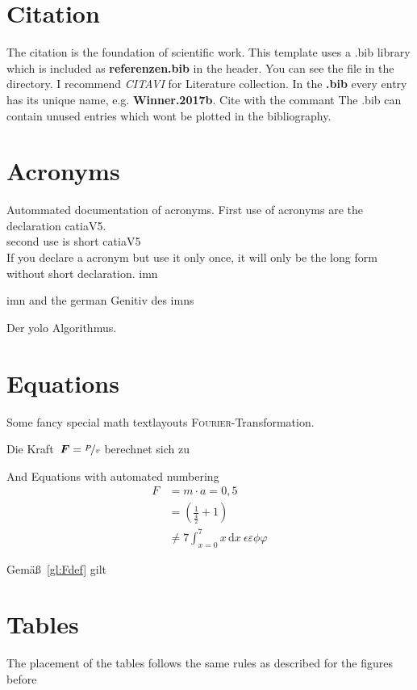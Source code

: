 \documentclass[12pt,
titlepage,
a4paper,
oneside,     %
openany,     %
listof=totoc,  %
numbers = noenddot, %
bibliography=totoc,    %
headsepline, %
]{scrbook} %
\newcommand{\ve}[1]{\ensuremath \boldsymbol{#1}\xspace}
\newcommand{\scFt}{\textsc{Fourier}-Transformation\xspace}
\begin{document}
\section{Citation}
\label{sec_citation}
The citation is the foundation of scientific work. This template uses a .bib library which is included as \textbf{referenzen.bib} in the header. You can see the file in the directory. I recommend \textit{CITAVI} for Literature collection.
In the \textbf{.bib} every entry has its unique name, e.g. \textbf{Winner.2017b}. Cite with the commant \cite{Winner.2017b}
The .bib can contain unused entries which wont be plotted in the bibliography.

\section{Acronyms}
\label{sec_acronyms}
Autommated documentation of acronyms.
First use of acronyms are the declaration \ac{catiaV5}.  \\
second use is short \ac{catiaV5} \\
If you declare a acronym but use it only once, it will only be the long form without short declaration. \ac{imn} 

\ac{imn} and the german Genitiv des \acp{imn}

Der \ac{yolo} Algorithmus.

\section{Equations}
\label{sec_Equations}
Some fancy special math textlayouts \scFt.

Die Kraft~$\ve{F} = \nicefrac{P}{v}$ berechnet sich zu

And Equations with automated numbering
\begin{align}
	F &= m \cdot a = 0,5 \nonumber\\
	&= \left( \frac{1}{\frac{4}{2}} + 1 \right)	\label{gl:Fdef}\\
	&\neq 7 \int_{x=0}^{7} x \, \mathrm{d}x ~ \epsilon \varepsilon \phi \varphi
\end{align}

Gemäß~\ref{gl:Fdef} gilt

\section{Tables}
\label{sec:tables}
The placement of the tables follows the same rules as described for the figures before
\end{document}

